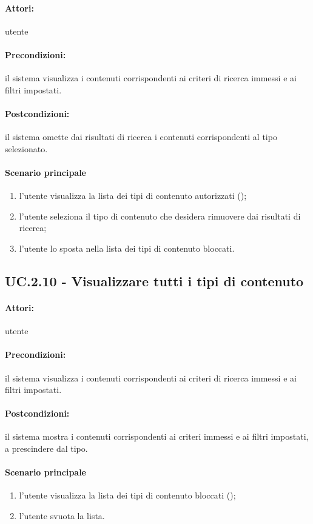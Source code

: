 \documentclass[10pt,a4paper,headinclude,footinclude,hidelinks]{scrreprt} %
\begin{document}
	\paragraph{Attori:} utente
	\paragraph{Precondizioni:} il sistema visualizza i contenuti corrispondenti ai criteri di ricerca immessi e ai filtri impostati.
	\paragraph{Postcondizioni:} il sistema omette dai risultati di ricerca i contenuti corrispondenti al tipo selezionato.
	\paragraph{Scenario principale}
	\begin{enumerate}
	\item l'utente visualizza la lista dei tipi di contenuto autorizzati ();
	\item l'utente seleziona il tipo di contenuto che desidera rimuovere dai risultati di ricerca;
	\item l'utente lo sposta nella lista dei tipi di contenuto bloccati.
	\end{enumerate}

	\subsection[UC.2.10]{UC.2.10 - Visualizzare tutti i tipi di contenuto}
	\label{sec:stage:ar:uc:2_10}
	\paragraph{Attori:} utente
	\paragraph{Precondizioni:} il sistema visualizza i contenuti corrispondenti ai criteri di ricerca immessi e ai filtri impostati.
	\paragraph{Postcondizioni:} il sistema mostra i contenuti corrispondenti ai criteri immessi e ai filtri impostati, a prescindere dal tipo.
	\paragraph{Scenario principale}
	\begin{enumerate}
	\item l'utente visualizza la lista dei tipi di contenuto bloccati ();
	\item l'utente svuota la lista.
	\end{enumerate}
\end{document}
